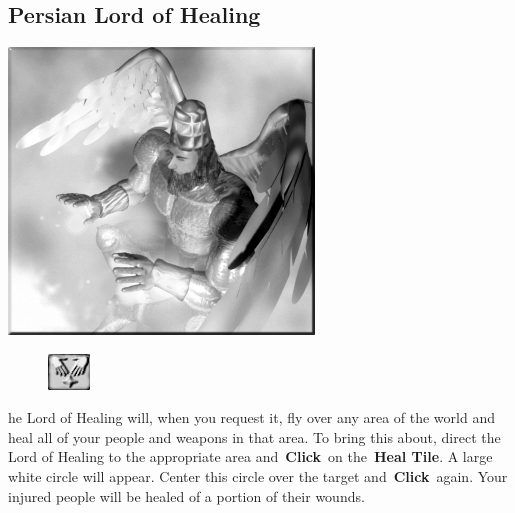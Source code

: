 \subsection{Persian Lord of Healing}


\begin{center}
	\includegraphics[width=1\linewidth]{Ahealinglord}
\end{center}

\begin{figure}
	\vspace{-20pt}
	\begin{center}
		\includegraphics[width=0.1\textwidth]{Theal}
	\end{center}
	\vspace{-20pt}
\end{figure}

he Lord of Healing will, when you request it, fly over any area of the world and heal all of your people and weapons in that area. To bring this about, direct the Lord of Healing to the appropriate area and \textbf{Click} on the \textbf{Heal Tile}. A large white circle will appear. Center this circle over the target and \textbf{Click} again. Your injured people will be healed of a portion of their wounds.

